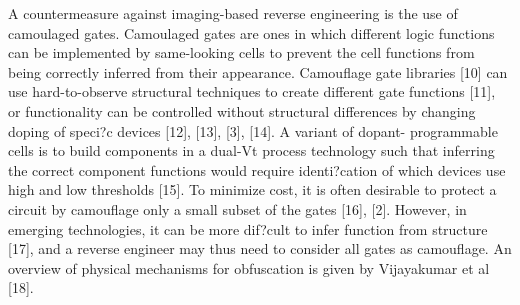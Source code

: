 \documentclass[proposal]{umassthesis}  %
\begin{document}
A countermeasure against imaging-based reverse engineering is the use of camoulaged gates. Camoulaged gates are ones in which different logic functions can be implemented by same-looking cells to prevent the cell functions from being correctly inferred from their appearance. Camouflage gate libraries [10] can use hard-to-observe structural techniques to create different gate functions [11], or functionality can be controlled without structural differences by changing doping of speci?c devices [12], [13], [3], [14]. A variant of dopant- programmable cells is to build components in a dual-Vt process technology such that inferring the correct component functions would require identi?cation of which devices use high and low thresholds [15]. To minimize cost, it is often desirable to protect a circuit by camouflage only a small subset of the gates [16], [2]. However, in emerging technologies, it can be more dif?cult to infer function from structure [17], and a reverse engineer may thus need to consider all gates as camouflage.  An overview of physical mechanisms for obfuscation is given by Vijayakumar et al [18].
\end{document}
